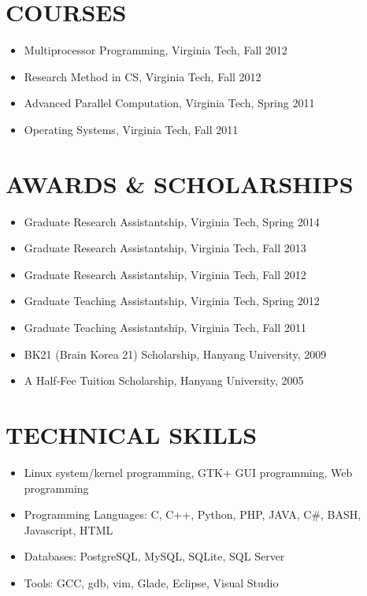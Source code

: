 \documentclass{res}
\begin{document}
\begin{resume}
\section{COURSES}
\vspace{0.2in}
 \begin{itemize}
  \item Multiprocessor Programming, Virginia Tech, Fall 2012
  \item Research Method in CS, Virginia Tech, Fall 2012
  \item Advanced Parallel Computation, Virginia Tech, Spring 2011
  \item Operating Systems, Virginia Tech, Fall 2011
 \end{itemize}

\section{AWARDS \& SCHOLARSHIPS}
\vspace{0.2in}
 \begin{itemize}
  \item Graduate Research Assistantship, Virginia Tech, Spring 2014
  \item Graduate Research Assistantship, Virginia Tech, Fall 2013
  \item Graduate Research Assistantship, Virginia Tech, Fall 2012
  \item Graduate Teaching Assistantship, Virginia Tech, Spring 2012
  \item Graduate Teaching Assistantship, Virginia Tech, Fall 2011
  \item BK21 (Brain Korea 21) Scholarship, Hanyang University, 2009
  \item A Half-Fee Tuition Scholarship, Hanyang University, 2005
 \end{itemize}

\section{TECHNICAL SKILLS}
\vspace{0.2in}
 \begin{itemize}
  \item Linux system/kernel programming, GTK+ GUI programming, Web programming
  \item Programming Languages: C, C++, Python, PHP, JAVA, C\#, BASH, Javascript, HTML
  \item Databases: PostgreSQL, MySQL, SQLite, SQL Server
  \item Tools: GCC, gdb, vim, Glade, Eclipse, Visual Studio
 \end{itemize}
 
\end{resume}
\end{document}

